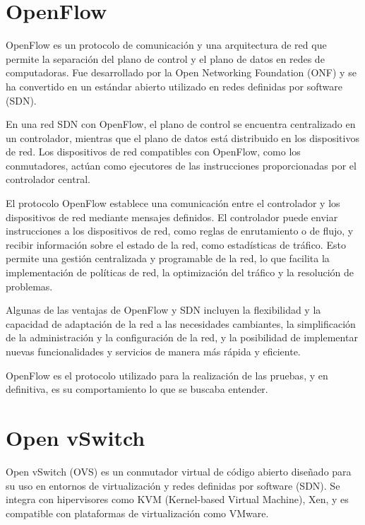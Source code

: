 \documentclass[a4paper, 12pt]{book}
\begin{document}
	\section{OpenFlow}
	\label{sec:openflow}
	
	
	OpenFlow es un protocolo de comunicación y una arquitectura de red que permite la separación del plano de control y el plano de datos en redes de computadoras. Fue desarrollado por la Open Networking Foundation (ONF) y se ha convertido en un estándar abierto utilizado en redes definidas por software (SDN).
	
	En una red SDN con OpenFlow, el plano de control se encuentra centralizado en un controlador, mientras que el plano de datos está distribuido en los dispositivos de red. Los dispositivos de red compatibles con OpenFlow, como los conmutadores, actúan como ejecutores de las instrucciones proporcionadas por el controlador central.
	
	El protocolo OpenFlow establece una comunicación entre el controlador y los dispositivos de red mediante mensajes definidos. El controlador puede enviar instrucciones a los dispositivos de red, como reglas de enrutamiento o de flujo, y recibir información sobre el estado de la red, como estadísticas de tráfico. Esto permite una gestión centralizada y programable de la red, lo que facilita la implementación de políticas de red, la optimización del tráfico y la resolución de problemas.
	
	Algunas de las ventajas de OpenFlow y SDN incluyen la flexibilidad y la capacidad de adaptación de la red a las necesidades cambiantes, la simplificación de la administración y la configuración de la red, y la posibilidad de implementar nuevas funcionalidades y servicios de manera más rápida y eficiente.
	
	OpenFlow es el protocolo utilizado para la realización de las pruebas, y en definitiva, es su comportamiento lo que se buscaba entender.
	
	\section{Open vSwitch} 
	\label{sec:vswitch}
	
	Open vSwitch (OVS) es un conmutador virtual de código abierto diseñado para su uso en entornos de virtualización y redes definidas por software (SDN). Se integra con hipervisores como KVM (Kernel-based Virtual Machine), Xen, y es compatible con plataformas de virtualización como VMware.
	
\end{document}

